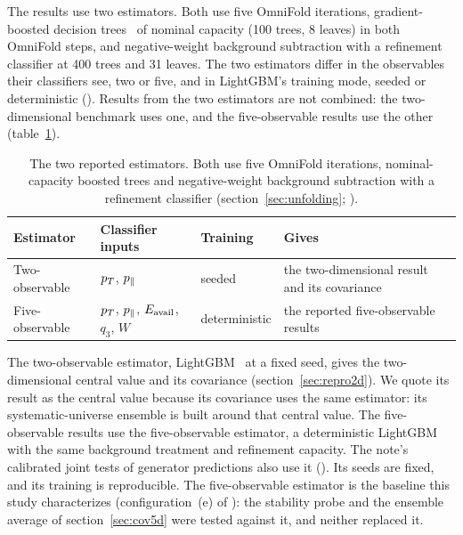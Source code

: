 The results use two estimators. Both use five OmniFold iterations, gradient-boosted decision trees~\cite{Pedregosa:2011sklearn,Ke:2017lightgbm} of nominal capacity (100 trees, 8 leaves) in both OmniFold steps, and negative-weight background subtraction with a refinement classifier at 400 trees and 31 leaves. The two estimators differ in the observables their classifiers see, two or five, and in LightGBM's training mode, seeded or deterministic (). Results from the two estimators are not combined: the two-dimensional benchmark uses one, and the five-observable results use the other (table~\ref{tab:estimators}).

\begin{table}[tb]
\centering
\caption{The two reported estimators. Both use five OmniFold iterations, nominal-capacity boosted trees and negative-weight background subtraction with a refinement classifier (section~\ref{sec:unfolding}; ).}
\label{tab:estimators}
\footnotesize\setlength{\tabcolsep}{3pt}
\begin{tabular}{@{}>{\raggedright\arraybackslash}p{1.8cm}>{\raggedright\arraybackslash}p{2.0cm}>{\raggedright\arraybackslash}p{1.85cm}>{\raggedright\arraybackslash}p{2.35cm}@{}}
\toprule
Estimator & Classifier inputs & Training & Gives \\
\midrule
Two-observable & $p_{T}$, $p_{\parallel}$ & seeded & the two-dimensional result and its covariance \\
Five-observable & $p_{T}$, $p_{\parallel}$, $E_{\mathrm{avail}}$, $q_3$, $W$ & deterministic & the reported five-observable results \\
\bottomrule
\end{tabular}
\end{table}

The two-observable estimator, LightGBM~\cite{Ke:2017lightgbm} at a fixed seed, gives the two-dimensional central value and its covariance (section~\ref{sec:repro2d}). We quote its result as the central value because its covariance uses the same estimator: its systematic-universe ensemble is built around that central value. The five-observable results use the five-observable estimator, a deterministic LightGBM with the same background treatment and refinement capacity. The note's calibrated joint tests of generator predictions also use it (). Its seeds are fixed, and its training is reproducible. The five-observable estimator is the baseline this study characterizes (configuration~(e) of ): the stability probe and the ensemble average of section~\ref{sec:cov5d} were tested against it, and neither replaced it.


